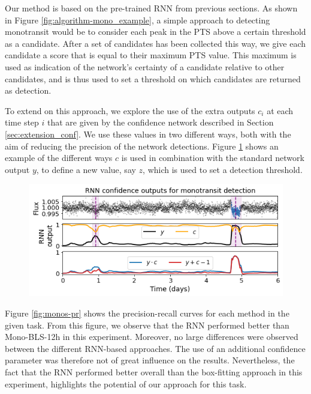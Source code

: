 Our method is based on the pre-trained RNN from previous sections. As shown in Figure \ref{fig:algorithm-mono_example}, a simple approach to detecting monotransit would be to consider each peak in the PTS above a certain threshold as a candidate. After a set of candidates has been collected this way, we give each candidate a score that is equal to their maximum PTS value. This maximum is used as indication of the network's certainty of a candidate relative to other candidates, and is thus used to set a threshold on which candidates are returned as detection.

To extend on this approach, we explore the use of the extra outputs $c_i$ at each time step $i$ that are given by the confidence network described in Section \ref{sec:extension_conf}. We use these values in two different ways, both with the aim of reducing the precision of the network detections. Figure \ref{fig:monos-conf_example} shows an example of the different ways $c$ is used in combination with the standard network output $y$, to define a new value, say $z$, which is used to set a detection threshold. 

\begin{figure}
    \centering
    \includegraphics[width=0.65\linewidth]{Experiments/Figures/Monos/monos_example.png}
    \caption{}
    \label{fig:monos-conf_example}
\end{figure}

Figure \ref{fig:monos-pr} shows the precision-recall curves for each method in the given task. From this figure, we observe that the RNN performed better than Mono-BLS-12h in this experiment. Moreover, no large differences were observed between the different RNN-based approaches. The use of an additional confidence parameter was therefore not of great influence on the results. Nevertheless, the fact that the RNN performed better overall than the box-fitting approach in this experiment, highlights the potential of our approach for this task. 

